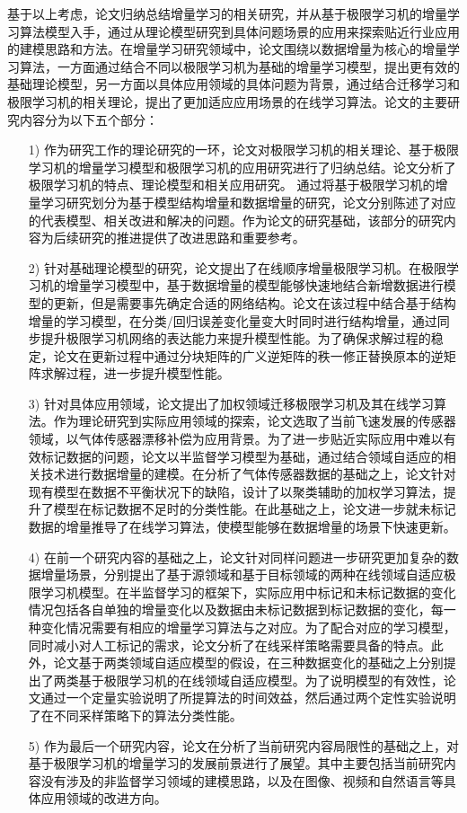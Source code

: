 基于以上考虑，论文归纳总结增量学习的相关研究，并从基于极限学习机的增量学习算法模型入手，通过从理论模型研究到具体问题场景的应用来探索贴近行业应用的建模思路和方法。在增量学习研究领域中，论文围绕以数据增量为核心的增量学习算法，一方面通过结合不同以极限学习机为基础的增量学习模型，提出更有效的基础理论模型，另一方面以具体应用领域的具体问题为背景，通过结合迁移学习和极限学习机的相关理论，提出了更加适应应用场景的在线学习算法。论文的主要研究内容分为以下五个部分：
\begin{enumerate}
\item[1)]作为研究工作的理论研究的一环，论文对极限学习机的相关理论、基于极限学习机的增量学习模型和极限学习机的应用研究进行了归纳总结。论文分析了极限学习机的特点、理论模型和相关应用研究。
通过将基于极限学习机的增量学习研究划分为基于模型结构增量和数据增量的研究，论文分别陈述了对应的代表模型、相关改进和解决的问题。作为论文的研究基础，该部分的研究内容为后续研究的推进提供了改进思路和重要参考。
\item[2)]针对基础理论模型的研究，论文提出了在线顺序增量极限学习机。在极限学习机的增量学习模型中，基于数据增量的模型能够快速地结合新增数据进行模型的更新，但是需要事先确定合适的网络结构。论文在该过程中结合基于结构增量的学习模型，在分类/回归误差变化量变大时同时进行结构增量，通过同步提升极限学习机网络的表达能力来提升模型性能。为了确保求解过程的稳定，论文在更新过程中通过分块矩阵的广义逆矩阵的秩一修正替换原本的逆矩阵求解过程，进一步提升模型性能。
\item[3)]针对具体应用领域，论文提出了加权领域迁移极限学习机及其在线学习算法。作为理论研究到实际应用领域的探索，论文选取了当前飞速发展的传感器领域，以气体传感器漂移补偿为应用背景。为了进一步贴近实际应用中难以有效标记数据的问题，论文以半监督学习模型为基础，通过结合领域自适应的相关技术进行数据增量的建模。在分析了气体传感器数据的基础之上，论文针对现有模型在数据不平衡状况下的缺陷，设计了以聚类辅助的加权学习算法，提升了模型在标记数据不足时的分类性能。在此基础之上，论文进一步就未标记数据的增量推导了在线学习算法，使模型能够在数据增量的场景下快速更新。
\item[4)]在前一个研究内容的基础之上，论文针对同样问题进一步研究更加复杂的数据增量场景，分别提出了基于源领域和基于目标领域的两种在线领域自适应极限学习机模型。在半监督学习的框架下，实际应用中标记和未标记数据的变化情况包括各自单独的增量变化以及数据由未标记数据到标记数据的变化，每一种变化情况需要有相应的增量学习算法与之对应。为了配合对应的学习模型，同时减小对人工标记的需求，论文分析了在线采样策略需要具备的特点。此外，论文基于两类领域自适应模型的假设，在三种数据变化的基础之上分别提出了两类基于极限学习机的在线领域自适应模型。为了说明模型的有效性，论文通过一个定量实验说明了所提算法的时间效益，然后通过两个定性实验说明了在不同采样策略下的算法分类性能。
\item[5)]作为最后一个研究内容，论文在分析了当前研究内容局限性的基础之上，对基于极限学习机的增量学习的发展前景进行了展望。其中主要包括当前研究内容没有涉及的非监督学习领域的建模思路，以及在图像、视频和自然语言等具体应用领域的改进方向。
\end{enumerate}

